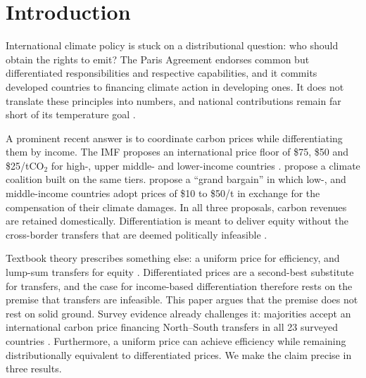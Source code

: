\documentclass[12pt,english]{article}
\newif\ifblind
\theoremstyle{remark}
\begin{document}
\clearpage

\ifblind
  \doublespacing
  \linenumbers
\else
  \tableofcontents
\fi

\section{Introduction}
\label{sec:intro}

International climate policy is stuck on a distributional question: who should obtain the rights to emit? The Paris Agreement endorses common but differentiated responsibilities and respective capabilities, and it commits developed countries to financing climate action in developing ones. It does not translate these principles into numbers, and national contributions remain far short of its temperature goal \citep{unep_emissions_2025}.

A prominent recent answer is to coordinate carbon prices while differentiating them by income. The IMF proposes an international price floor of \$75, \$50 and \$25/tCO$_2$ for high-, upper middle- and lower-income countries \citep{parry_proposal_2021}. \citet{wolfram_building_2025} propose a climate coalition built on the same tiers. \citet{banerjee_grand_2025} propose a ``grand bargain'' in which low-, and middle-income countries adopt prices of \$10 to \$50/t in exchange for the compensation of their climate damages. In all three proposals, carbon revenues are retained domestically. Differentiation is meant to deliver equity without the cross-border transfers that are deemed politically infeasible \citep{parry_proposal_2021}.

Textbook theory prescribes something else: a uniform price for efficiency, and lump-sum transfers for equity \citep{aldy_promise_2012}. Differentiated prices are a second-best substitute for transfers, and the case for income-based differentiation therefore rests on the premise that transfers are infeasible. This paper argues that the premise does not rest on solid ground. Survey evidence already challenges it: majorities accept an international carbon price financing North--South transfers in all 23 surveyed countries \citep{fabre_majority_2025,fabre_public_2025}. %
Furthermore, a uniform price can achieve efficiency while remaining 
distributionally equivalent to differentiated prices. We make the claim precise in three results.
\end{document}
